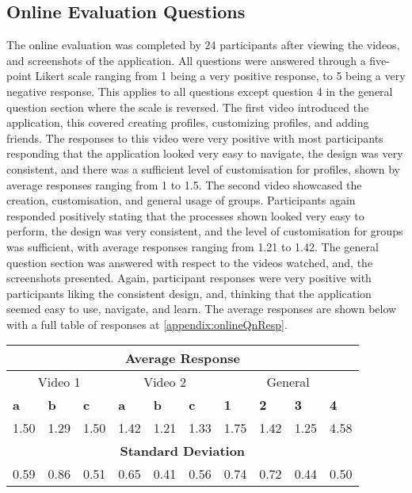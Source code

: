 \subsection{Online Evaluation Questions}

The online evaluation was completed by 24 participants after viewing the videos, and screenshots of the application. All questions were answered through a five-point Likert scale ranging from 1 being a very positive response, to 5 being a very negative response. This applies to all questions except question 4 in the general question section where the scale is reversed. The first video introduced the application, this covered creating profiles, customizing profiles, and adding friends. The responses to this video were very positive with most participants responding that the application looked very easy to navigate, the design was very consistent, and there was a sufficient level of customisation for profiles, shown by average responses ranging from 1 to 1.5. The second video showcased the creation, customisation, and general usage of groups. Participants again responded positively stating that the processes shown looked very easy to perform, the design was very consistent, and the level of customisation for groups was sufficient, with average responses ranging from 1.21 to 1.42. The general question section was answered with respect to the videos watched, and, the screenshots presented. Again, participant responses were very positive with participants liking the consistent design, and, thinking that the application seemed easy to use, navigate, and learn. The average responses are shown below with a full table of responses at \ref{appendix:onlineQnResp}.

\begin{table}[!ht]
    \centering
    \begin{tabular}{|l|l|l||l|l|l||l|l|l|l|}
    \hline
    \multicolumn{10}{|c|}{\textbf{Average Response }} \\
    \hline
     \multicolumn{3}{|c||}{Video 1 } &
     \multicolumn{3}{|c||}{Video 2 } &
     \multicolumn{4}{|c|}{General } \\
    \hline
        \textbf{a} & \textbf{b} & \textbf{c} & \textbf{a} & \textbf{b} & \textbf{c} & \textbf{1} & \textbf{2} & \textbf{3} & \textbf{4} \\ \hline
    \hline
        1.50 & 1.29 & 1.50 & 1.42 & 1.21 & 1.33 & 1.75 & 1.42 & 1.25 & 4.58 \\ \hline
        \multicolumn{10}{|c|}{\textbf{Standard Deviation }} \\ \hline
        0.59 & 0.86 & 0.51 & 0.65 & 0.41 & 0.56 & 0.74 & 0.72 & 0.44 & 0.50 \\ \hline
    \end{tabular}
\end{table}

